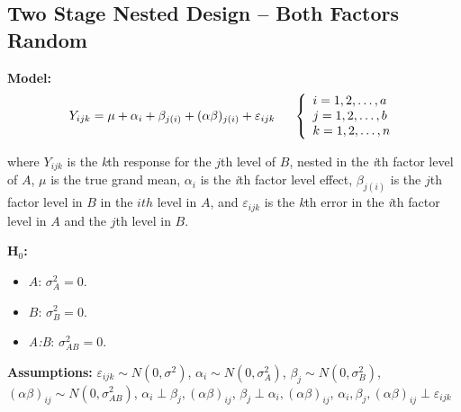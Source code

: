 \documentclass[12pt,english]{article}\usepackage[]{graphicx}\usepackage[table]{xcolor}
\begin{document}
\subsection{Two Stage Nested Design -- Both Factors Random}
\textbf{Model:} \[Y_{ijk} = \mu + \alpha_i + \beta_{j(i)} +(\alpha\beta)_{j(i)}+ \varepsilon_{ijk} \hspace{0.2in} \left\{
                \begin{array}{ll}
                  i = 1,2,\dots,a\\
                  j = 1,2,\dots,b\\
                  k = 1,2,\dots,n\\
                  \end{array}
              \right.\]

\noindent where $Y_{ijk}$ is the \textit{k}th response for the $j$th level of $B$, nested in the \textit{i}th factor level of $A$, $\mu$ is the true grand mean, $\alpha_i$ is the \textit{i}th factor level effect, $\beta_{j(i)}$ is the $j$th factor level in $B$ in the $ith$ level in $A$, and $\varepsilon_{ijk}$ is the \textit{k}th error in the \textit{i}th factor level in $A$ and the $j$th level in $B$. \\
\vspace{0.05in}

\noindent \textbf{H$_0$:}
\begin{itemize}
\item $A$: $\sigma^2_A = 0$.
\item $B$: $\sigma^2_B = 0$.
\item \textit{A:B}: $\sigma^2_{AB} = 0$.
\end{itemize}
\vspace{0.1in}
\noindent \textbf{Assumptions:} $\varepsilon_{ijk} \sim N(0, \sigma^2)$, \hspace{0.1in} $\alpha_i \sim N(0, \sigma^2_A)$,\hspace{0.1in} $\beta_j \sim N(0, \sigma^2_B)$, \hspace{0.1in}  $(\alpha\beta)_{ij} \sim N(0, \sigma^2_{AB})$, \hspace{0.1in} $\alpha_i \perp \beta_j, (\alpha\beta)_{ij}$,\hspace{0.1in} $\beta_j \perp \alpha_i, (\alpha\beta)_{ij}$, \hspace{0.1in}   $\alpha_i, \beta_j,(\alpha\beta)_{ij} \perp \varepsilon_{ijk}$
\vspace{0.1in}
\end{document}
